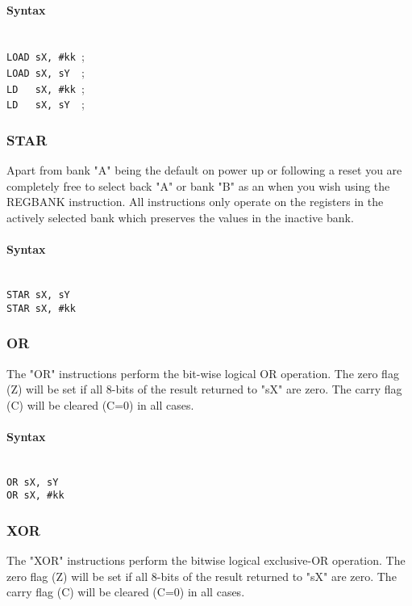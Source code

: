             \paragraph{Syntax}
                ~\\
                \verb'LOAD sX, #kk ';\\
                \verb'LOAD sX, sY  ';\\
                \verb'LD   sX, #kk ';\\
                \verb'LD   sX, sY  ';

        \subsubsection{STAR}
            Apart from bank "A" being the default on power up or following a reset you are completely free to select back "A" or bank "B" as an when you wish using the REGBANK instruction. All instructions only operate on the registers in the actively selected bank which preserves the values in the inactive bank.

            \paragraph{Syntax}
                ~\\
                \verb'STAR sX, sY'\\
                \verb'STAR sX, #kk'

        \subsubsection{OR}
            The "OR" instructions perform the bit-wise logical OR operation. The zero flag (Z) will be set if all 8-bits of the result returned to "sX" are zero. The carry flag (C) will be cleared (C=0) in all cases.

            \paragraph{Syntax}
                ~\\
                \verb'OR sX, sY'\\
                \verb'OR sX, #kk'

        \subsubsection{XOR}
            The "XOR" instructions perform the bit\-wise logical exclusive-OR operation. The zero flag (Z) will be set if all 8-bits of the result returned to "sX" are zero. The carry flag (C) will be cleared (C=0) in all cases.

